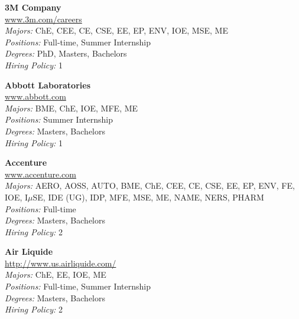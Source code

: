 \documentclass[twoside]{article}
\begin{document}
\begin{center}\begin{multicols}{3}
\begin{minipage}{.9\columnwidth}{\Large\bf 3M Company }\\
	\url{www.3m.com/careers}\\
	\emph{Majors:} ChE, CEE, CE, CSE, EE, EP, ENV, IOE, MSE, ME\\
	\emph{Positions:} Full-time, Summer Internship\\
	\emph{Degrees:} PhD, Masters, Bachelors\\
	\emph{Hiring Policy:} 1\\
\end{minipage}
 
\begin{minipage}{.9\columnwidth}{\Large\bf Abbott Laboratories }\\
	\url{www.abbott.com}\\
	\emph{Majors:} BME, ChE, IOE, MFE, ME\\
	\emph{Positions:} Summer Internship\\
	\emph{Degrees:} Masters, Bachelors\\
	\emph{Hiring Policy:} 1\\
\end{minipage}
 
\begin{minipage}{.9\columnwidth}{\Large\bf Accenture }\\
	\url{www.accenture.com}\\
	\emph{Majors:} AERO, AOSS, AUTO, BME, ChE, CEE, CE, CSE, EE, EP, ENV, FE, IOE, I$\mu$SE, IDE (UG), IDP, MFE, MSE, ME, NAME, NERS, PHARM\\
	\emph{Positions:} Full-time\\
	\emph{Degrees:} Masters, Bachelors\\
	\emph{Hiring Policy:} 2\\
\end{minipage}
 
\begin{minipage}{.9\columnwidth}{\Large\bf Air Liquide }\\
	\url{http://www.us.airliquide.com/}\\
	\emph{Majors:} ChE, EE, IOE, ME\\
	\emph{Positions:} Full-time, Summer Internship\\
	\emph{Degrees:} Masters, Bachelors\\
	\emph{Hiring Policy:} 2\\
\end{minipage}
 

\end{multicols}
\end{center}
\end{document}
